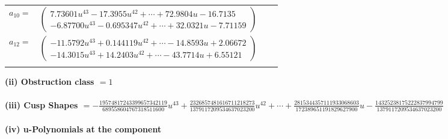 \documentclass[1p]{elsarticle_modified}
\theoremstyle{definition}
\begin{document}
\begin{tabular}{m{7pt} m{180pt} m{7pt} m{180pt} }
\flushright $a_{10}=$&$\begin{pmatrix}7.73601 u^{43}-17.3955 u^{42}+\cdots+72.9804 u-16.7135\\-6.87700 u^{43}-0.695347 u^{42}+\cdots+32.0321 u-7.71159\end{pmatrix}$ \\
\flushright $a_{12}=$&$\begin{pmatrix}-11.5792 u^{43}+0.144119 u^{42}+\cdots-14.8593 u+2.06672\\-14.3015 u^{43}+14.2403 u^{42}+\cdots-43.7714 u+6.55121\end{pmatrix}$\\&\end{tabular}
\flushleft \textbf{(ii) Obstruction class $= 1$}\\~\\
\flushleft \textbf{(iii) Cusp Shapes $= -\frac{19574817243399657342119}{689558604767318511600} u^{43}+\frac{2326857481616711218273}{1379117209534637023200} u^{42}+\cdots+\frac{2815344357111933068603}{172389651191829627900} u-\frac{14325238175222837994799}{1379117209534637023200}$}\\~\\
\newpage\renewcommand{\arraystretch}{1}
\flushleft \textbf{(iv) u-Polynomials at the component}\newline \\
\end{document}
